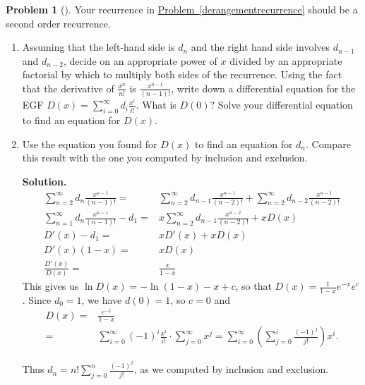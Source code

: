 \documentclass[10pt,]{book}
\theoremstyle{plain}
\theoremstyle{definition}
\newtheorem{activity}[project]{Problem}
\theoremstyle{definition}
\numberwithin{equation}{chapter}
\newcommand{\amp}{&}
\begin{document}
\begin{activity}[]\label{exponentialderangements}
Your recurrence in \hyperref[derangementrecurrence]{Problem~\ref{derangementrecurrence}} should be a second order recurrence.%
\begin{enumerate}[font=\bfseries,label=(\alph*),ref=\alph*]
\item\label{task-260} Assuming that the left-hand side is \(d_n\) and the right hand side involves \(d_{n-1}\) and \(d_{n-2}\), decide on an appropriate power of \(x\) divided by an appropriate factorial by which to multiply both sides of the recurrence.  Using the fact that the derivative of \(\frac{x^n}{n!}\) is \(\frac{x^{n-1}}{(n-1)!}\), write down a differential equation for the EGF \(D(x) =
\sum_{i=0}^\infty d_i\frac{x^i}{i!}\). What is \(D(0)\)?  Solve your differential equation to find an equation for \(D(x)\).%
\item\label{task-261} Use the equation you found for \(D(x)\) to find an equation for \(d_n\).  Compare this result with the one you computed by inclusion and exclusion.%
\par\medskip\noindent%
\textbf{Solution.}\quad %
\begin{align*}
\sum_{n=2}^\infty d_n\frac{x^{n-1}}{(n-1)!}
=\amp \sum_{n=2}^\infty d_{n-1}\frac{x^{n-1}}{(n-2)!} +\sum_{n=2}^\infty
d_{n-2}\frac{x^{n-1}}{(n-2)!}\\
\sum_{n=1}^\infty d_n\frac{x^{n-1}}{(n-1)!} -d_1  =\amp
x\sum_{n=2}^\infty d_{n-1}\frac{x^{n-2}}{(n-2)!} +xD(x)\\
D'(x) -d_1  =\amp  xD'(x) +xD(x)\\
D'(x)(1-x)  =\amp  xD(x)\\
\frac{D'(x)}{D(x)}  =\amp  \frac{x}{1-x}
\end{align*}
This gives us \(\ln D(x) = -\ln(1-x) -x +c\), so that \(D(x) = \frac{1}{1-x}e^{-x}e^c\). Since \(d_0=1\), we have \(d(0)=1\), so \(c=0\) and%
\begin{align*}
D(x)  =\amp  \frac{e^{-x}}{1-x}\\
=\amp
\sum_{i=0}^\infty(-1)^i\frac{x^i}{i!}\cdot\sum_{j=0}^\infty
x^j=\sum_{i=0}^\infty\left(\sum_{j=0}^i \frac{(-1)^j}{j!}\right)
x^i.
\end{align*}
%
\par
Thus \(d_n = n!\sum_{j=0}^n\frac{(-1)^j}{j!}\), as we computed by inclusion and exclusion.%
\end{enumerate}
\end{activity}
\typeout{************************************************}
\typeout{************************************************}
\end{document}
